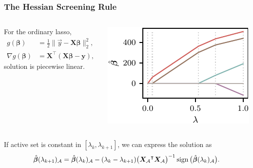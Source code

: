\documentclass[10pt]{beamer}
\begin{document}
\begin{frame}
  \frametitle{The Hessian Screening Rule}
  \begin{columns}
    \begin{column}{0.45\textwidth}
      For the ordinary lasso,
      \begin{align*}
        g(\bm{\beta})        & = \frac 1 2 \lVert \vec{y} - \bm{X \beta} \rVert_2^2, \\
        \nabla g(\bm{\beta}) & = \bm{X}^\intercal(\bm{X\beta} - \bm{y}),
      \end{align*}
      solution is \alert{piecewise linear}.
    \end{column}
    \begin{column}{0.45\textwidth}
      \centering
      \includegraphics[width=\textwidth]{figures/paper3-lasso-path.pdf}
    \end{column}
  \end{columns}

  \bigskip\pause


  If active set is constant in \([\lambda_k,\lambda_{k+1}]\), we can express the solution as
  \begin{equation*}
    \hat{\bm{\beta}}(\lambda_{k+1})_\mathcal{A} =
    \hat{\bm{\beta}}(\lambda_k)_\mathcal{A} -
    (\lambda_k - \lambda_{k+1})\big({\bm{X}_\mathcal{A}}^\intercal \bm{X}_\mathcal{A}\big)^{-1}
    \operatorname{sign}\big(\hat{\bm{\beta}}(\lambda_k)_\mathcal{A}\big).
  \end{equation*}


\end{frame}
\end{document}
